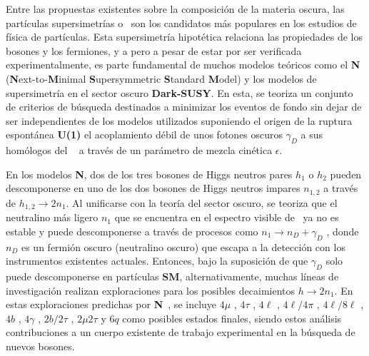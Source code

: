 Entre las propuestas existentes sobre la composición de la materia oscura, las partículas supersimetrías o \SUSY ~son los candidatos más populares en los estudios de física de partículas. Esta supersimetría hipotética relaciona las propiedades de los bosones y los fermiones, y a pero a pesar de estar por ser verificada experimentalmente, es parte fundamental de muchos modelos teóricos como el \textbf{N}\MSSM ~ (\textbf{N}ext-to-\textbf{M}inimal \textbf{S}upersymmetric \textbf{S}tandard \textbf{M}odel) y los modelos de supersimetría en el sector oscuro \textbf{Dark-SUSY}. En esta, se teoriza un conjunto de criterios de búsqueda destinados a minimizar los eventos de fondo sin dejar de ser independientes de los modelos utilizados suponiendo el origen de la ruptura espontánea \textbf{U(1)} el acoplamiento débil de unos fotones oscuros $\gamma_D$ a sus homólogos del \ME ~ a través de un parámetro de mezcla cinética $\epsilon$. %


En los modelos \textbf{N}\MSSM, dos de los tres bosones de Higgs neutros pares $h_1$ o $h_2$ pueden descomponerse en uno de los dos bosones de Higgs neutros impares $n_{1,2}$ a través de $h_{1,2} \rightarrow  2n_1$. Al unificarse con la teoría del sector oscuro, se teoriza que el neutralino más ligero $n_1$ que se encuentra en el espectro visible de \SUSY ~ya no es estable y puede descomponerse a través de procesos como $n_1  \rightarrow n_D + \gamma_D$ , donde $n_D$ es un fermión oscuro (neutralino oscuro) que escapa a la detección con los instrumentos existentes actuales. Entonces, bajo la suposición de que $\gamma_D$ solo puede descomponerse en partículas \textbf{SM}, alternativamente, muchas líneas de investigación realizan exploraciones para los posibles decaimientos $h \rightarrow 2n_1$. En estas exploraciones predichas por \textbf{N}\MSSM ~, se incluye $4\mu$ \citep{cms_collaboration_search_2016,cms_collaboration_search_2013}
, $4\tau$ %
, $4\ell$ \citep{cms_collaboration_search_2018,lhcb_collaboration_search_2016}
, $4\ell/4\pi$ \citep{cms_collaboration_search_2018}
, $4\ell/8\ell$ \citep{atlas_collaboration_search_2016-2}
, $4b$ \citep{atlas_collaboration_search_2018-1,atlas_collaboration_search_2016-3}
, $4\gamma$ \citep{atlas_collaboration_search_2014}
, $2b/2\tau$ \citep{atlas_collaboration_search_2018-2}
, $2\mu 2\tau$ \citep{atlas_collaboration_search_2015-1}
y $6q$ \citep{cms_collaboration_search_2016-2} 
como posibles estados finales, siendo estos análisis contribuciones a un cuerpo existente de trabajo experimental en la búsqueda de nuevos bosones.

